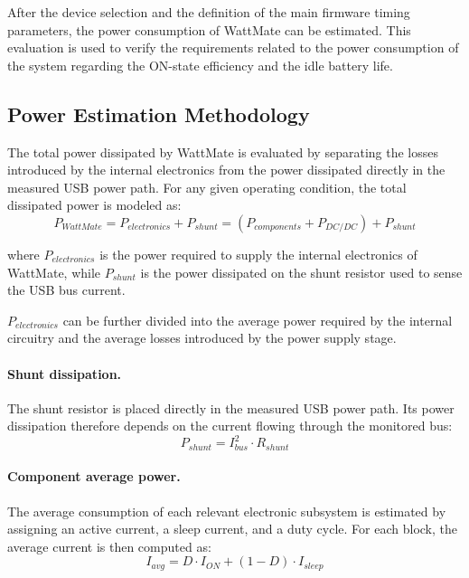 After the device selection and the definition of the main firmware timing parameters, the power consumption of WattMate can be estimated. 
This evaluation is used to verify the requirements related to the power consumption of the system regarding the ON-state efficiency and the idle battery life.

\subsection{Power Estimation Methodology}
\label{sec:power_estimation_methodology}

The total power dissipated by WattMate is evaluated by separating the losses introduced by the internal electronics from the power dissipated directly in the measured USB power path. 
For any given operating condition, the total dissipated power is modeled as:
\begin{equation}
	P_{WattMate} = P_{electronics} + P_{shunt} = (P_{components} + P_{DC/DC}) + P_{shunt}
\end{equation}

where \(P_{electronics}\) is the power required to supply the internal electronics of WattMate, while \(P_{shunt}\) is the power dissipated on the shunt resistor used to sense the USB bus current.

\(P_{electronics}\) can be further divided into the average power required by the internal circuitry and the average losses introduced by the power supply stage. 

\paragraph{Shunt dissipation.}
The shunt resistor is placed directly in the measured USB power path. 
Its power dissipation therefore depends on the current flowing through the monitored bus:
\begin{equation}
	P_{shunt} = I_{bus}^{2} \cdot R_{shunt}
\end{equation}

\paragraph{Component average power.}
The average consumption of each relevant electronic subsystem is estimated by assigning an active current, a sleep current, and a duty cycle. 
For each block, the average current is then computed as:
\begin{equation}
	\label{current_avg_formula}
	I_{avg} = D \cdot I_{ON} + \left(1-D\right) \cdot I_{sleep}
\end{equation}

